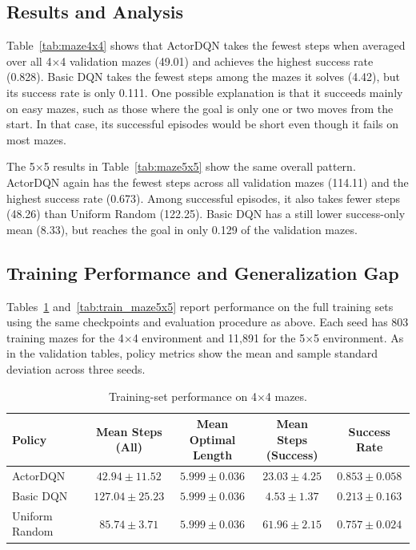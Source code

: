 \documentclass[a4paper,12pt]{article}
\begin{document}
\FloatBarrier
\subsection{Results and Analysis}

Table~\ref{tab:maze4x4} shows that ActorDQN takes the fewest steps when averaged over all 4$\times$4 validation mazes (49.01) and achieves the highest success rate (0.828). Basic DQN takes the fewest steps among the mazes it solves (4.42), but its success rate is only 0.111. One possible explanation is that it succeeds mainly on easy mazes, such as those where the goal is only one or two moves from the start. In that case, its successful episodes would be short even though it fails on most mazes.

The 5$\times$5 results in Table~\ref{tab:maze5x5} show the same overall pattern. ActorDQN again has the fewest steps across all validation mazes (114.11) and the highest success rate (0.673). Among successful episodes, it also takes fewer steps (48.26) than Uniform Random (122.25). Basic DQN has a still lower success-only mean (8.33), but reaches the goal in only 0.129 of the validation mazes.

\subsection{Training Performance and Generalization Gap}

Tables~\ref{tab:train_maze4x4} and~\ref{tab:train_maze5x5} report performance on the full training sets using the same checkpoints and evaluation procedure as above. Each seed has 803 training mazes for the 4$\times$4 environment and 11,891 for the 5$\times$5 environment. As in the validation tables, policy metrics show the mean and sample standard deviation across three seeds.

\begin{table}[htbp]
    \centering
    \caption{Training-set performance on 4$\times$4 mazes.}
    \small
    \setlength{\tabcolsep}{4pt}
    \begin{tabular}{lcccc}
        \hline
        Policy & \shortstack{Mean Steps\\(All)} & \shortstack{Mean Optimal\\Length} & \shortstack{Mean Steps\\(Success)} & Success Rate \\
        \hline
        ActorDQN & $\mathbf{42.94 \pm 11.52}$ & $5.999 \pm 0.036$ & $23.03 \pm 4.25$ & $\mathbf{0.853 \pm 0.058}$ \\
        Basic DQN & $127.04 \pm 25.23$ & $5.999 \pm 0.036$ & $\mathbf{4.53 \pm 1.37}$ & $0.213 \pm 0.163$ \\
        Uniform Random & $85.74 \pm 3.71$ & $5.999 \pm 0.036$ & $61.96 \pm 2.15$ & $0.757 \pm 0.024$ \\
        \hline
    \end{tabular}
    \label{tab:train_maze4x4}
\end{table}
\end{document}
